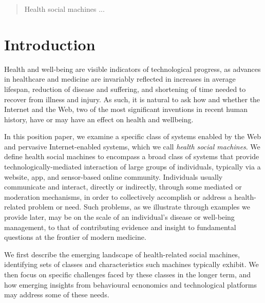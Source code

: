 \documentclass{sig-alternate}
\begin{document}
\maketitle
\begin{abstract}

Health social machines ...

\end{abstract}




\section{Introduction}

Health and well-being are visible indicators of technological
progress, as advances in healthcare and medicine are invariably
reflected in increases in average lifespan, reduction of disease and
suffering, and shortening of time needed to recover from illness and
injury.  As such, it is natural to ask how and whether the Internet
and the Web, two of the most significant inventions in recent human
history, have or may have an effect on health and wellbeing.

In this position paper, we examine a specific class of systems enabled
by the Web and pervasive Internet-enabled systems, which we call
\emph{health social machines}.  We define health social machines to
encompass a broad class of systems that provide
technologically-mediated interaction of large groups of individuals,
typically via a website, app, and sensor-based online community.
Individuals usually communicate and interact, directly or indirectly,
through some mediated or moderation mechanisms, in order to
collectively accomplish or address a health-related problem or need.
Such problems, as we illustrate through examples we provide later, may
be on the scale of an individual's disease or well-being management,
to that of contributing evidence and insight to fundamental questions
at the frontier of modern medicine.

We first describe the emerging landscape of health-related social
machines, identifying sets of classes and characteristics such
machines typically exhibit.  We then focus on specific challenges
faced by these classes in the longer term, and how emerging insights
from behavioural ecnonomics and technological platforms may address
some of these needs.
\end{document}
